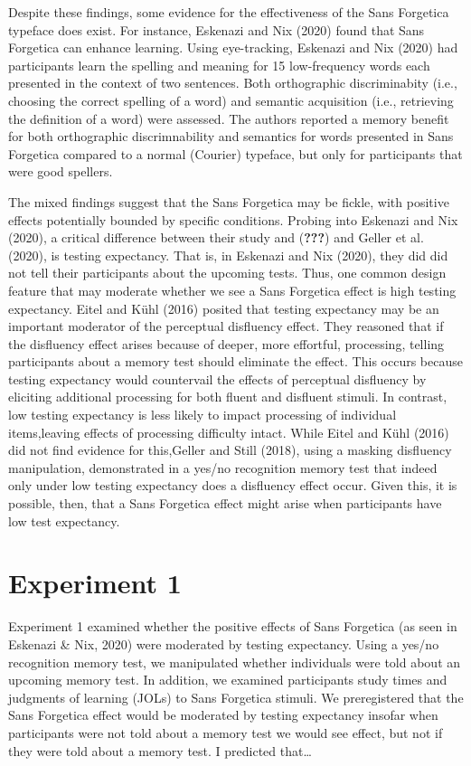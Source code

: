 \documentclass[
  english,
  man]{apa6}
\begin{document}
Despite these findings, some evidence for the effectiveness of the Sans Forgetica typeface does exist. For instance, Eskenazi and Nix (2020) found that Sans Forgetica can enhance learning. Using eye-tracking, Eskenazi and Nix (2020) had participants learn the spelling and meaning for 15 low-frequency words each presented in the context of two sentences. Both orthographic discriminabity (i.e., choosing the correct spelling of a word) and semantic acquisition (i.e., retrieving the definition of a word) were assessed. The authors reported a memory benefit for both orthographic discrimnability and semantics for words presented in Sans Forgetica compared to a normal (Courier) typeface, but only for participants that were good spellers.

The mixed findings suggest that the Sans Forgetica may be fickle, with positive effects potentially bounded by specific conditions. Probing into Eskenazi and Nix (2020), a critical difference between their study and ({\textbf{???}}) and Geller et al. (2020), is testing expectancy. That is, in Eskenazi and Nix (2020), they did did not tell their participants about the upcoming tests. Thus, one common design feature that may moderate whether we see a Sans Forgetica effect is high testing expectancy. Eitel and Kühl (2016) posited that testing expectancy may be an important moderator of the perceptual disfluency effect. They reasoned that if the disfluency effect arises because of deeper, more effortful, processing, telling participants about a memory test should eliminate the effect. This occurs because testing expectancy would countervail the effects of perceptual disfluency by eliciting additional processing for both fluent and disfluent stimuli. In contrast, low testing expectancy is less likely to impact processing of individual items,leaving effects of processing difficulty intact. While Eitel and Kühl (2016) did not find evidence for this,Geller and Still (2018), using a masking disfluency manipulation, demonstrated in a yes/no recognition memory test that indeed only under low testing expectancy does a disfluency effect occur. Given this, it is possible, then, that a Sans Forgetica effect might arise when participants have low test expectancy.

\hypertarget{experiment-1}{%
\section{Experiment 1}\label{experiment-1}}

Experiment 1 examined whether the positive effects of Sans Forgetica (as seen in Eskenazi \& Nix, 2020) were moderated by testing expectancy. Using a yes/no recognition memory test, we manipulated whether individuals were told about an upcoming memory test. In addition, we examined participants study times and judgments of learning (JOLs) to Sans Forgetica stimuli. We preregistered that the Sans Forgetica effect would be moderated by testing expectancy insofar when participants were not told about a memory test we would see effect, but not if they were told about a memory test. I predicted that\ldots{}
\end{document}
